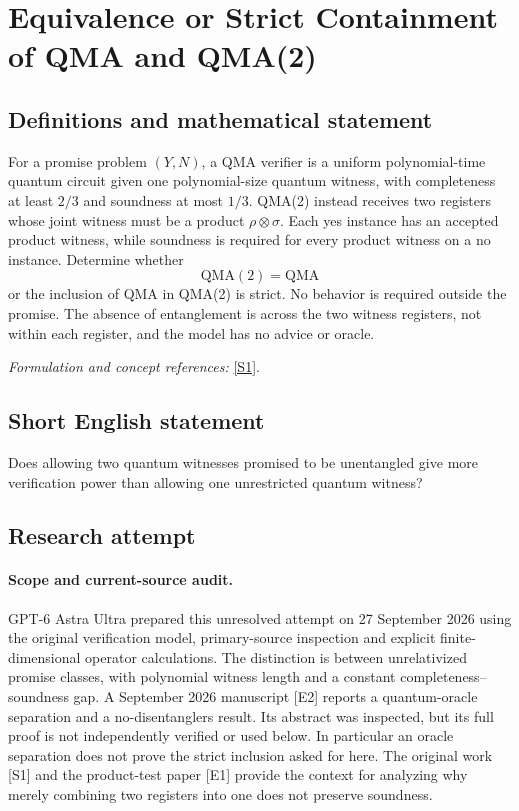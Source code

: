 \documentclass[11pt]{article}
\begin{document}
\section*{\texorpdfstring{Equivalence or Strict Containment of QMA and QMA(2)}{Equivalence or Strict Containment of QMA and QMA(2)}}\label{30006821}
\subsection{Definitions and mathematical statement}
For a promise problem $(Y,N)$, a QMA verifier is a uniform polynomial-time quantum circuit given one polynomial-size quantum witness, with completeness at least $2/3$ and soundness at most $1/3$. QMA(2) instead receives two registers whose joint witness must be a product $\rho\otimes\sigma$. Each yes instance has an accepted product witness, while soundness is required for every product witness on a no instance. Determine whether
\[
 \mathrm{QMA}(2)=\mathrm{QMA}
\]
or the inclusion of QMA in QMA(2) is strict. No behavior is required outside the promise. The absence of entanglement is across the two witness registers, not within each register, and the model has no advice or oracle.
\par\smallskip\textit{Formulation and concept references:} \href{https://theoryofcomputing.org/articles/v005a001/v005a001.pdf}{[S1]}.

\subsection{Short English statement}
Does allowing two quantum witnesses promised to be unentangled give more verification power than allowing one unrestricted quantum witness?
\subsection{Research attempt}
\paragraph{Scope and current-source audit.}
GPT-6 Astra Ultra prepared this unresolved attempt on 27 September 2026
using the original verification model, primary-source inspection and
explicit finite-dimensional operator calculations. The distinction is
between unrelativized promise classes, with polynomial witness length
and a constant completeness--soundness gap. A September 2026 manuscript
[E2] reports a quantum-oracle separation and a no-disentanglers result.
Its abstract was inspected, but its full proof is not independently
verified or used below. In particular an oracle separation does not
prove the strict inclusion asked for here. The original work [S1] and
the product-test paper [E1] provide the context for analyzing why merely
combining two registers into one does not preserve soundness.
\end{document}

